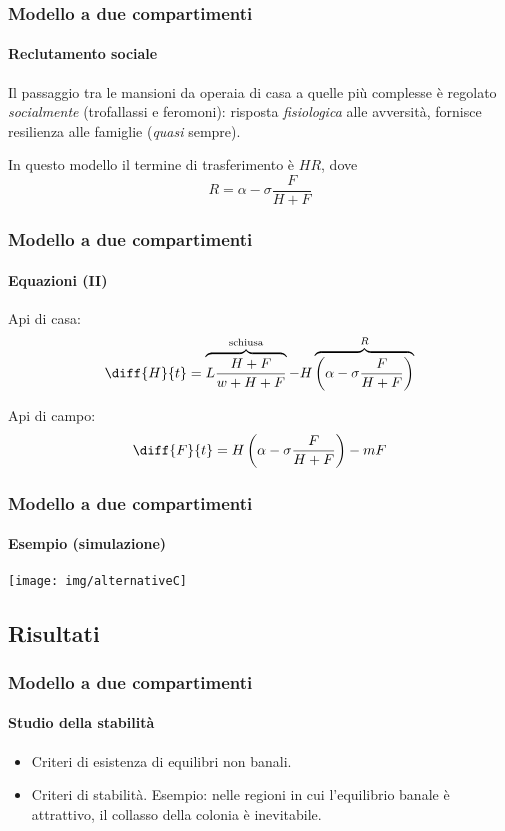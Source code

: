 \documentclass[]{beamer}
\begin{document}
\begin{frame}
    \frametitle{Modello a due compartimenti}
    \framesubtitle{Reclutamento sociale}

    Il passaggio tra le mansioni da operaia di casa a quelle più complesse è regolato \emph{socialmente}
    (trofallassi e feromoni):
    \pause
    risposta \emph{fisiologica} alle avversità,
    \pause
    fornisce resilienza alle famiglie \pause (\emph{quasi} sempre).

    \pause
    In questo modello il termine di trasferimento è $H R$, dove
    $$R = \alpha - \sigma \frac{F}{H+F}$$
\end{frame}

\begin{frame}
    \frametitle{Modello a due compartimenti}
    \framesubtitle{Equazioni (II)}

    Api di casa:
    $$\diff{H}{t} = \overbrace{L \frac{H+F}{w+H+F}}^{\text{schiusa}} - H
    \overbrace{\left( \alpha - \sigma \frac{F}{H+F} \right)}^{R} $$

    \pause
    Api di campo:
    $$\diff{F}{t} = H \left( \alpha - \sigma \frac{F}{H+F} \right) - mF $$
\end{frame}

\begin{frame}
    \frametitle{Modello a due compartimenti}
    \framesubtitle{Esempio (simulazione)}

    \begin{center}
        \texttt{[image: img/alternativeC]}
    \end{center}
\end{frame}


\subsection{Risultati}


\begin{frame}
    \frametitle{Modello a due compartimenti}
    \framesubtitle{Studio della stabilità}

    \begin{itemize}
        \item Criteri di esistenza di equilibri non banali.
        \item \pause Criteri di stabilità. \pause Esempio:
            nelle regioni in cui l'equilibrio banale è attrattivo, il collasso della colonia è inevitabile.
    \end{itemize}
\end{frame}
\end{document}
